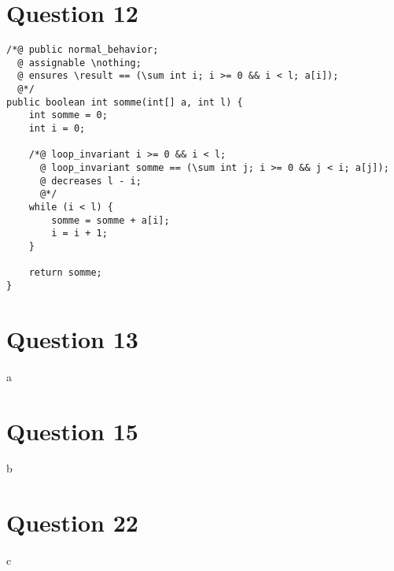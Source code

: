 \documentclass{article}
\begin{document}
\section{Question 12}
\begin{lstlisting}
/*@ public normal_behavior;
  @ assignable \nothing;
  @ ensures \result == (\sum int i; i >= 0 && i < l; a[i]);
  @*/
public boolean int somme(int[] a, int l) {
	int somme = 0;
	int i = 0;
	
	/*@ loop_invariant i >= 0 && i < l;
	  @ loop_invariant somme == (\sum int j; i >= 0 && j < i; a[j]);
	  @ decreases l - i;
	  @*/
	while (i < l) {
		somme = somme + a[i];
		i = i + 1;
	}
	
	return somme;
}
\end{lstlisting}

\section{Question 13}
a

\section{Question 15}
b

\section{Question 22}
c
\end{document}
